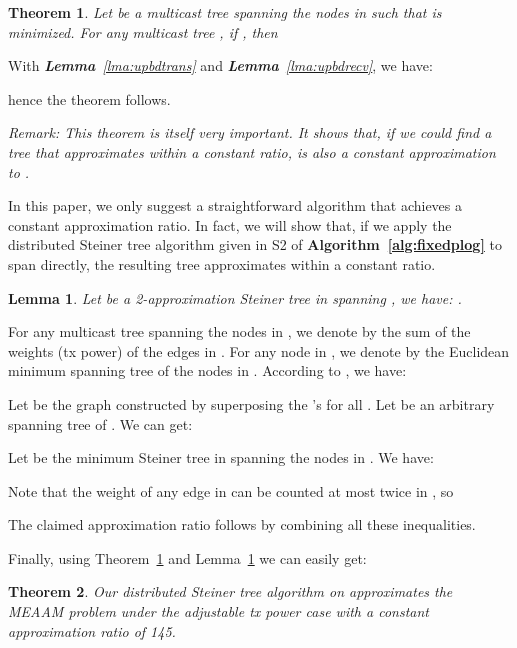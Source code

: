 \documentclass[10pt, conference, compsocconf]{IEEEtran}
\newtheorem{lemma}{\textbf{Lemma}}
\newtheorem{theorem}{\textbf{Theorem}}
\begin{document}
  \begin{theorem}
Let  be a multicast tree spanning the nodes in  such that  is minimized. For any multicast tree , if , then 
    \label{thm:relation}
\end{theorem}
\begin{IEEEproof}
With \textit{\textbf{Lemma}~\ref{lma:upbdtrans}} and \textit{\textbf{Lemma}~\ref{lma:upbdrecv}}, we have:

hence the theorem follows.
\end{IEEEproof}

  \vspace{1ex}\noindent\textit{Remark: This theorem is itself very important. It shows that, if we could find a tree  that approximates  within a constant ratio,  is also a constant approximation to .}\vspace{1ex}

  In this paper, we only suggest a straightforward algorithm that achieves a constant approximation ratio. In fact, we will show that, if we apply the distributed Steiner tree algorithm given in S2 of \textbf{Algorithm~\ref{alg:fixedplog}} to span  directly, the resulting tree  approximates  within a constant ratio.
\begin{lemma}
Let  be a 2-approximation Steiner tree in  spanning , we have: .
    \label{lma:steiner}
\end{lemma}
\begin{IEEEproof}
For any multicast tree  spanning the nodes in , we denote by  the sum of the weights (tx power) of the edges in . For any node  in , we denote by  the Euclidean minimum spanning tree of the nodes in . According to \cite{Wan2004}, we have:


    Let  be the graph constructed by superposing the 's for all . Let  be an arbitrary spanning tree of . We can get:


    Let  be the minimum Steiner tree in  spanning the nodes in . We have:


    Note that the weight of any edge in  can be counted at most twice in , so


    The claimed approximation ratio follows by combining all these inequalities.
\end{IEEEproof}

  Finally, using Theorem~\ref{thm:relation} and Lemma~\ref{lma:steiner} we can easily get:
\begin{theorem}
Our distributed Steiner tree algorithm on  approximates the MEAAM problem under the adjustable tx power case with a constant approximation ratio of 145. \label{thm:adjustable}
\end{theorem}
\end{document}
